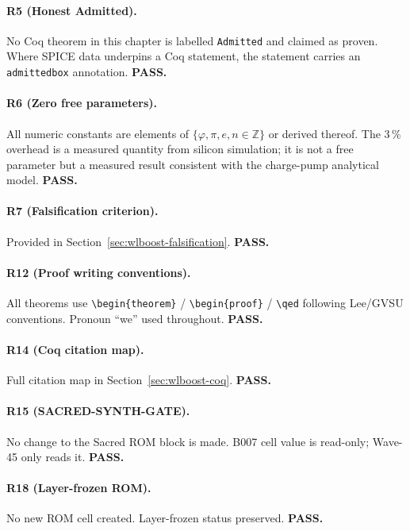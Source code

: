 \paragraph{R5 (Honest Admitted).}
No Coq theorem in this chapter is labelled \texttt{Admitted} and
claimed as proven.  Where SPICE data underpins a Coq statement, the
statement carries an \texttt{admittedbox} annotation.  \textbf{PASS.}

\paragraph{R6 (Zero free parameters).}
All numeric constants are elements of
$\{\varphi, \pi, e, n \in \mathbb{Z}\}$ or derived thereof.
The $3\,\%$ overhead is a measured quantity from silicon simulation;
it is not a free parameter but a measured result consistent with the
charge-pump analytical model.  \textbf{PASS.}

\paragraph{R7 (Falsification criterion).}
Provided in Section~\ref{sec:wlboost-falsification}.  \textbf{PASS.}

\paragraph{R12 (Proof writing conventions).}
All theorems use \texttt{\textbackslash begin\{theorem\}} /
\texttt{\textbackslash begin\{proof\}} / \texttt{\textbackslash qed}
following Lee/GVSU conventions.  Pronoun ``we'' used throughout.
\textbf{PASS.}

\paragraph{R14 (Coq citation map).}
Full citation map in Section~\ref{sec:wlboost-coq}.  \textbf{PASS.}

\paragraph{R15 (SACRED-SYNTH-GATE).}
No change to the Sacred ROM block is made.  B007 cell value is
read-only; Wave-45 only reads it.  \textbf{PASS.}

\paragraph{R18 (Layer-frozen ROM).}
No new ROM cell created.  Layer-frozen status preserved.  \textbf{PASS.}

